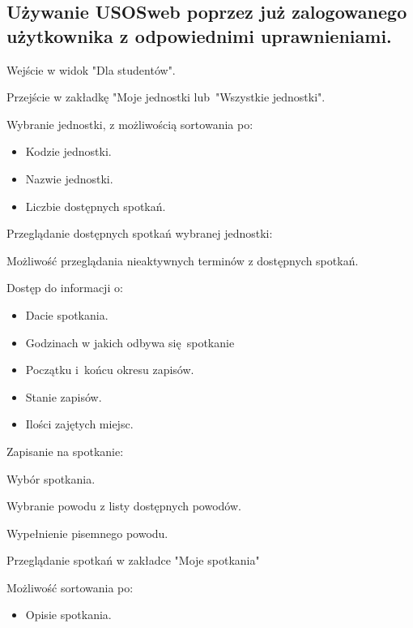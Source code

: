 \documentclass[licencjacka]{pracamgr}
\begin{document}
\subsection{Używanie USOSweb poprzez już zalogowanego użytkownika z odpowiednimi uprawnieniami.}
	\begin{step}
			\item Wejście w widok "Dla studentów".
			\item Przejście w zakładkę "Moje jednostki lub~"Wszystkie jednostki".
			\item Wybranie jednostki, z możliwością sortowania po:
				\begin{itemize}
					\item Kodzie jednostki.
					\item Nazwie jednostki.
					\item Liczbie dostępnych spotkań. 
				\end{itemize}
			\item Przeglądanie dostępnych spotkań wybranej jednostki:
				\begin{step}
					\item Możliwość przeglądania nieaktywnych terminów z dostępnych spotkań.
					\item Dostęp do informacji o:
						\begin{itemize}
							\item Dacie spotkania.
							\item Godzinach w jakich odbywa się~spotkanie
							\item Początku i~końcu okresu zapisów.
							\item Stanie zapisów.
							\item Ilości zajętych miejsc.
						\end{itemize}
				\end{step}
			\item Zapisanie na spotkanie:
				\begin{step}
					\item Wybór spotkania.
					\item Wybranie powodu z listy dostępnych powodów.
					\item Wypełnienie pisemnego powodu.
				\end{step}
			\item Przeglądanie spotkań w zakładce "Moje spotkania"
				\begin{step}
					\item Możliwość sortowania po:
						\begin{itemize}
							\item Opisie spotkania.

\end{itemize}
\end{step}
\end{step}
\end{document}
